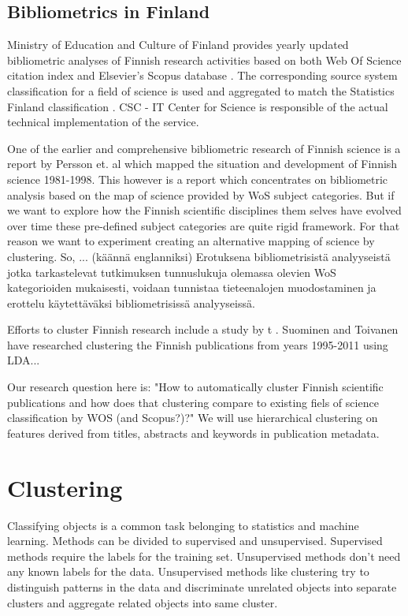 

\subsection{Bibliometrics in Finland}
Ministry of Education and Culture of Finland provides yearly
updated bibliometric analyses of Finnish research activities 
based on both Web Of Science citation index 
and Elsevier's Scopus database \cite[Vipunen 
service]{noauthor_ministry_2019}. The corresponding source 
system classification for a field of science is used and
aggregated to match the Statistics Finland classification 
\cite{auranen_tieteen_2018}. CSC - 
IT Center for Science is responsible of the actual technical 
implementation of the service.

One of the earlier and comprehensive bibliometric research of 
Finnish science is a report by Persson et. al 
\cite{persson_bibliometric_2000} which mapped the situation and 
development of Finnish science 1981-1998.
This however is a report which concentrates on bibliometric 
analysis based on the map of science provided by WoS subject 
categories. But if we want to explore how the Finnish scientific 
disciplines them selves have evolved over time these pre-defined 
subject categories are quite rigid framework. For that reason we 
want to experiment creating an alternative mapping of science by 
clustering. 
So, ... (käännä englanniksi)
Erotuksena bibliometrisistä analyyseistä jotka tarkastelevat 
tutkimuksen tunnuslukuja olemassa olevien WoS kategorioiden 
mukaisesti, voidaan tunnistaa tieteenalojen muodostaminen ja 
erottelu käytettäväksi bibliometrisissä analyyseissä.

Efforts to cluster Finnish research include a study by t
.
Suominen and Toivanen have researched clustering the Finnish
publications from years 1995-2011 using LDA... 
\cite{suominen_map_2016}  

Our research question here is: "How to automatically cluster 
Finnish
scientific publications and how does that clustering compare to
existing fiels of science classification by WOS (and Scopus?)?" We
 will use hierarchical clustering on features derived from titles,
  abstracts and keywords in publication metadata.


\section{Clustering}
Classifying objects is a common task belonging to statistics and 
machine learning. Methods can be divided to supervised and 
unsupervised. Supervised methods require the labels for the training
set. Unsupervised methods don't need any known labels for the data.
Unsupervised methods like clustering try to distinguish patterns 
in the data and discriminate unrelated objects into separate 
clusters and aggregate related objects into same cluster.

